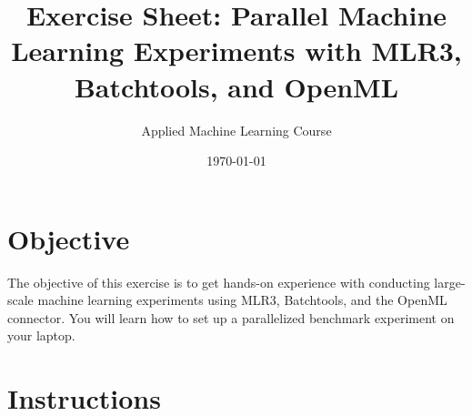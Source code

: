 \documentclass[a4paper,11pt]{article}
\title{Exercise Sheet: Parallel Machine Learning Experiments with MLR3, Batchtools, and OpenML}
\author{Applied Machine Learning Course}
\date{\today}
\begin{document}
\maketitle

\section*{Objective}
The objective of this exercise is to get hands-on experience with conducting large-scale machine learning experiments using MLR3, Batchtools, and the OpenML connector. You will learn how to set up a parallelized benchmark experiment on your laptop.

\section*{Instructions}
\end{document}
